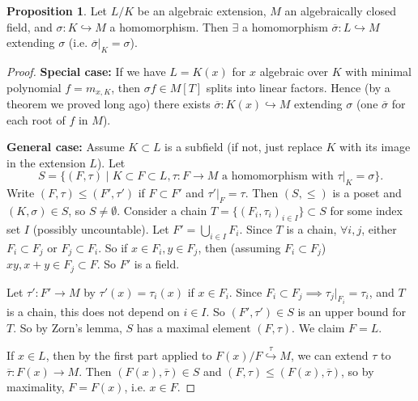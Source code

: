 \documentclass{article}
\theoremstyle{definition}
\newtheorem{prop}[theorem]{Proposition}
\begin{document}
\begin{prop}\label{14.5}
    Let $L/K$ be an algebraic extension, $M$ an algebraically closed field, and $\sigma : K \hookrightarrow M$ a homomorphism. Then $\exists$ a homomorphism $\overline{\sigma} : L \hookrightarrow M$ extending $\sigma$ (i.e. $\overline{\sigma}|_K = \sigma$).
\end{prop}
\begin{proof}
    \textbf{Special case:} If we have $L=K(x)$ for $x$ algebraic over $K$ with minimal polynomial $f=m_{x,K}$, then $\sigma f \in M[T]$ splits into linear factors. Hence (by a theorem we proved long ago) there exists $\overline{\sigma} : K(x) \hookrightarrow M$ extending $\sigma$ (one $\overline{\sigma}$ for each root of $f$ in $M$).
    \vspace{1mm}
    
    \textbf{General case:} Assume $K \subset L$ is a subfield (if not, just replace $K$ with its image in the extension $L$). Let \[
    S = \{(F,\tau) \mid K \subset F \subset L, \tau : F \to M \text{ a homomorphism with }\tau|_K = \sigma\}.
    \]
    Write $(F,\tau) \le (F', \tau')$ if $F \subset F'$ and $\tau'|_F=\tau$. Then $(S,\le )$ is a poset and $(K,\sigma) \in S$, so $S \neq \emptyset$. Consider a chain $T = \{(F_i, \tau_i)_{i \in I}\}\subset S$ for some index set $I$ (possibly uncountable). Let $F' = \bigcup_{i \in  I} F_i$. Since $T$ is a chain, $\forall i,j$, either $F_i \subset F_j$ or $F_j \subset F_i$. So if $x \in F_i, y \in F_j$, then (assuming $F_i \subset F_j$) $xy,x+y \in F_j \subset F$. So $F'$ is a field.
    \vspace{1mm}
    
    Let $\tau' : F' \to M$ by $\tau'(x)=\tau_i(x)$ if $x \in F_i$. Since $F_i \subset F_j \implies \tau_j|_{F_i} = \tau_i$, and $T$ is a chain, this does not depend on $i \in I$. So $(F',\tau') \in S$ is an upper bound for $T$. So by Zorn's lemma, $S$ has a maximal element $(F,\tau)$. We claim $F=L$.
    \vspace{1mm}
    
    If $x \in L$, then by the first part applied to $F(x)/F \stackrel{\tau}{\hookrightarrow} M$, we can extend $\tau$ to $\overline{\tau}: F(x)\to M$. Then $(F(x),\overline{\tau}) \in S$ and $(F,\tau)\le (F(x),\overline{\tau})$, so by maximality, $F=F(x)$, i.e. $x \in F$.
\end{proof}
\end{document}
